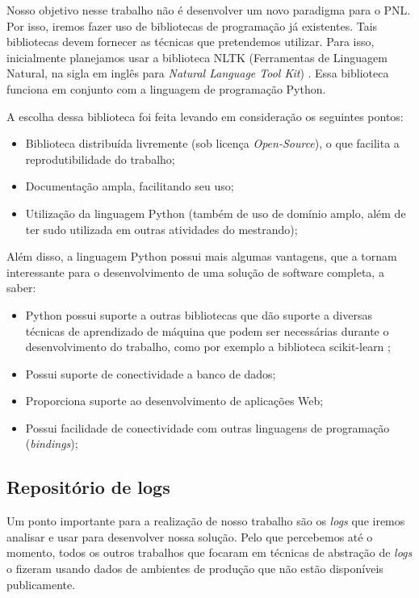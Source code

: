 \documentclass[
	12pt,				%
	openright,			%
	twoside,			%
	a4paper,			%
	english,			%
	spanish,			%
	brazil,				%
	]{abntex2}
\begin{document}
Nosso objetivo nesse trabalho não é desenvolver um novo paradigma para o PNL. Por isso, iremos fazer uso de bibliotecas de programação já existentes. Tais bibliotecas devem fornecer as técnicas que pretendemos utilizar. Para isso, inicialmente planejamos usar a biblioteca NLTK (Ferramentas de Linguagem Natural, na sigla em inglês para \emph{Natural Language Tool Kit}) \cite{bird2009natural}. Essa biblioteca funciona em conjunto com a linguagem de programação Python.

A escolha dessa biblioteca foi feita levando em consideração os seguintes pontos:

\begin{itemize}
	\item Biblioteca distribuída livremente (sob licença \emph{Open-Source}), o que facilita a reprodutibilidade do trabalho;
	\item Documentação ampla, facilitando seu uso;
	\item Utilização da linguagem Python (também de uso de domínio amplo, além de ter sudo utilizada em outras atividades do mestrando);
\end{itemize}

Além disso, a linguagem Python possui mais algumas vantagens, que a tornam interessante para o desenvolvimento de uma solução de software completa, a saber:

\begin{itemize}
	\item Python possui suporte a outras bibliotecas que dão suporte a diversas técnicas de aprendizado de máquina que podem ser necessárias durante o desenvolvimento do trabalho, como por exemplo a biblioteca scikit-learn \cite{pedregosa2008scikitlearn};
	\item Possui suporte de conectividade a banco de dados;
	\item Proporciona suporte ao desenvolvimento de aplicações Web;
	\item Possui facilidade de conectividade com outras linguagens de programação (\emph{bindings});
\end{itemize}

\subsection{Repositório de logs}

Um ponto importante para a realização de nosso trabalho são os \emph{logs} que iremos analisar e usar para desenvolver nossa solução. Pelo que percebemos até o momento, todos os outros trabalhos que focaram em técnicas de abstração de \emph{logs} o fizeram usando dados de ambientes de produção que não estão disponíveis publicamente.
\end{document}
